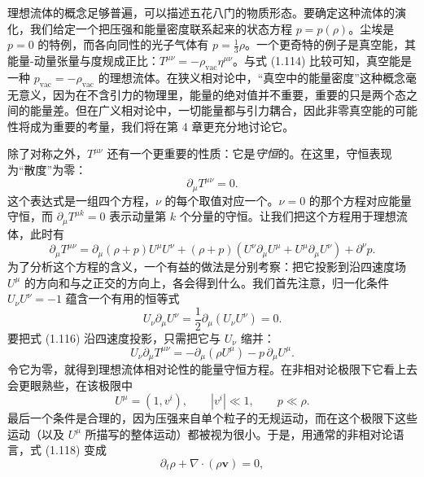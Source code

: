 理想流体的概念足够普遍，可以描述五花八门的物质形态。要确定这种流体的演化，我们给定一个把压强和能量密度联系起来的状态方程 $p=p(\rho)$。尘埃是 $p=0$ 的特例，而各向同性的光子气体有 $p=\frac{1}{3}\rho$。一个更奇特的例子是真空能，其能量-动量张量与度规成正比：$T^{\mu\nu}=-\rho_{\mathrm{vac}}\eta^{\mu\nu}$。与式 (1.114) 比较可知，真空能是一种 $p_{\mathrm{vac}}=-\rho_{\mathrm{vac}}$ 的理想流体。在狭义相对论中，“真空中的能量密度”这种概念毫无意义，因为在不含引力的物理里，能量的绝对值并不重要，重要的只是两个态之间的能量差。但在广义相对论中，一切能量都与引力耦合，因此非零真空能的可能性将成为重要的考量，我们将在第 4 章更充分地讨论它。

除了对称之外，$T^{\mu\nu}$ 还有一个更重要的性质：它是\emph{守恒}的。在这里，守恒表现为“散度”为零：
\begin{equation*}
\boxed{\partial_{\mu}T^{\mu\nu} = 0.}
\tag{1.115}
\end{equation*}
这个表达式是一组四个方程，$\nu$ 的每个取值对应一个。$\nu=0$ 的那个方程对应能量守恒，而 $\partial_{\mu}T^{\mu k}=0$ 表示动量第 $k$ 个分量的守恒。让我们把这个方程用于理想流体，此时有
\begin{equation*}
\partial_{\mu}T^{\mu\nu} = \partial_{\mu}(\rho+p)U^{\mu}U^{\nu} + (\rho+p)(U^{\nu}\partial_{\mu}U^{\mu} + U^{\mu}\partial_{\mu}U^{\nu}) + \partial^{\nu}p.
\tag{1.116}
\end{equation*}
为了分析这个方程的含义，一个有益的做法是分别考察：把它投影到沿四速度场 $U^{\mu}$ 的方向和与之正交的方向上，各会得到什么。我们首先注意，归一化条件 $U_{\nu}U^{\nu}=-1$ 蕴含一个有用的恒等式
\begin{equation*}
U_{\nu}\partial_{\mu}U^{\nu} = \frac{1}{2}\partial_{\mu}(U_{\nu}U^{\nu}) = 0.
\tag{1.117}
\end{equation*}
要把式 (1.116) 沿四速度投影，只需把它与 $U_{\nu}$ 缩并：
\begin{equation*}
U_{\nu}\partial_{\mu}T^{\mu\nu} = -\partial_{\mu}(\rho U^{\mu}) - p\,\partial_{\mu}U^{\mu}.
\tag{1.118}
\end{equation*}
令它为零，就得到理想流体相对论性的能量守恒方程。在非相对论极限下它看上去会更眼熟些，在该极限中
\begin{equation*}
U^{\mu} = (1, v^{i}), \qquad |v^{i}| \ll 1, \qquad p \ll \rho.
\tag{1.119}
\end{equation*}
最后一个条件是合理的，因为压强来自单个粒子的无规运动，而在这个极限下这些运动（以及 $U^{\mu}$ 所描写的整体运动）都被视为很小。于是，用通常的非相对论语言，式 (1.118) 变成
\begin{equation*}
\partial_t\rho + \nabla\cdot(\rho\mathbf{v}) = 0,
\tag{1.120}
\end{equation*}
